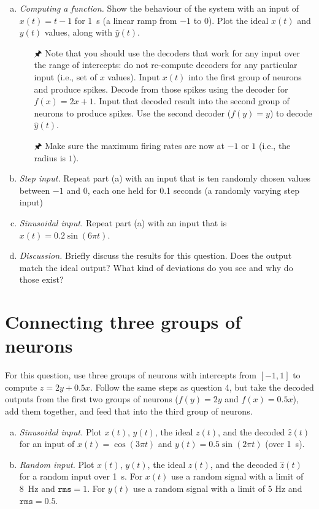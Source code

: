 	\begin{enumerate}[a)]
		\item {} \emph{Computing a function.} Show the behaviour of the system with an input of $x(t)=t-1$ for \SI{1}{\second} (a linear ramp from $-1$ to $0$). Plot the ideal $x(t)$ and $y(t)$ values, along with $\hat{y}(t)$.
		\begin{itemize}
			\item[\symbolfont 🖈] Note that you should use the decoders that work for any input over the range of intercepts: do not re-compute decoders for any particular input (i.e., set of $x$ values).
			Input $x(t)$ into the first group of neurons and produce spikes. Decode from those spikes using the decoder for $f(x)=2x+1$. Input that decoded result into the second group of neurons to produce spikes. Use the second decoder ($f(y)=y$) to decode $\hat{y}(t)$.
			\item[\symbolfont 🖈] Make sure the maximum firing rates are now at $-1$ or $1$ (i.e., the radius is $1$).
		\end{itemize}
		\item {} \emph{Step input.} Repeat part (a) with an input that is ten randomly chosen values between $-1$ and $0$, each one held for 0.1 seconds (a randomly varying step input)
		\item {} \emph{Sinusoidal input.} Repeat part (a) with an input that is $x(t)=0.2\sin(6\pi t)$.
		\item {} \emph{Discussion.} Briefly discuss the results for this question. Does the output match the ideal output? What kind of deviations do you see and why do those exist?
	\end{enumerate}

	\section{Connecting three groups of neurons}
		
	For this question, use three groups of neurons with intercepts from $[-1, 1]$ to compute $z = 2y+0.5x$. Follow the same steps as question 4, but take the decoded outputs from the first two groups of neurons ($f(y)=2y$ and $f(x)=0.5x$), add them together, and feed that into the third group of neurons.

	\begin{enumerate}[a)]
		\item {} \emph{Sinusoidal input.} Plot $x(t)$, $y(t)$, the ideal $z(t)$, and the decoded $\hat{z}(t)$ for an input of $x(t)=\cos(3\pi t)$ and $y(t)=0.5 \sin (2 \pi t)$ (over \SI{1}{\second}).
		\item {} \emph{Random input.} Plot $x(t)$, $y(t)$, the ideal $z(t)$, and the decoded $\hat{z}(t)$ for a random input over \SI{1}{\second}. For $x(t)$ use a random signal with a limit of \SI{8}{\hertz} and $\mathtt{rms}=1$. For $y(t)$ use a random signal with a limit of 5 Hz and $\mathtt{rms}=0.5$.
	\end{enumerate}


